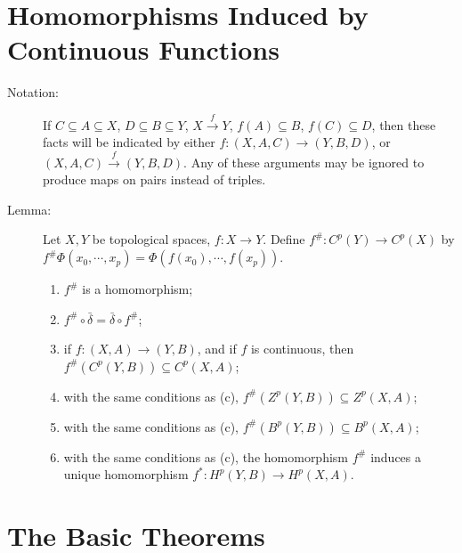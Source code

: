 \documentclass{article}
\begin{document}
\section{Homomorphisms Induced by Continuous Functions}

\begin{description}

\item[Notation:] If $C \subseteq A \subseteq X$, $D \subseteq B \subseteq Y$, $X \xrightarrow{\ f \ } Y$, $f(A) \subseteq B$, $f(C) \subseteq D$, then these facts will be indicated by either $f: (X,A,C) \longrightarrow (Y,B,D)$, or $(X,A,C) \xrightarrow{\ f \ } (Y,B,D)$. Any of these arguments may be ignored to produce maps on pairs instead of triples.

\item[Lemma:] Let $X,Y$ be topological spaces, $f: X \longrightarrow Y$. Define $f^{\#}: C^p(Y) \longrightarrow C^p(X)$ by $f^{\#} \Phi(x_0,\cdots,x_p) = \Phi(f(x_0),\cdots,f(x_p))$.
  \begin{enumerate}[\hspace{1cm}(a)]
    \item $f^{\#}$ is a homomorphism;
    \item $f^{\#} \circ \bar{\delta} = \bar{\delta} \circ f^{\#}$;
    \item if $f: (X,A) \rightarrow (Y,B)$, and if $f$ is continuous, then $f^{\#}(C^p(Y,B)) \subseteq C^p(X,A)$;
    \item with the same conditions as (c), $f^{\#}(Z^p(Y,B)) \subseteq Z^p(X,A)$;
    \item with the same conditions as (c), $f^{\#}(B^p(Y,B)) \subseteq B^p(X,A)$;
    \item with the same conditions as (c), the homomorphism $f^{\#}$ induces a unique homomorphism $f^*: H^p(Y,B) \rightarrow H^p(X,A)$.
  \end{enumerate}

\end{description}



\section{The Basic Theorems}
\end{document}
